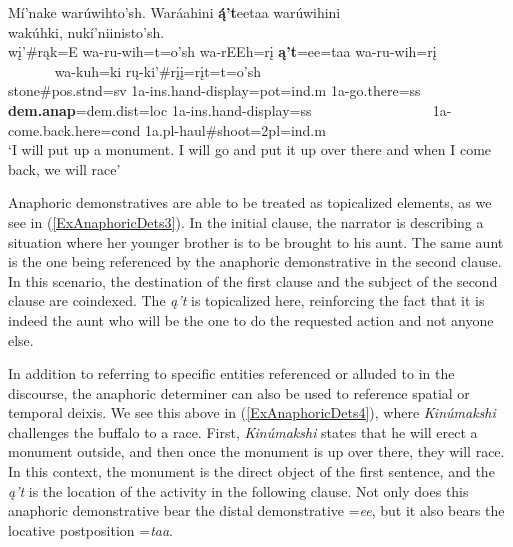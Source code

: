 \begin{exe}
\begin{xlist}
\item\label{ExAnaphoricDets4} \glll Mí'nake warúwihto'sh. Waráahini \textbf{ą́'t}eetaa warúwihini ~ ~ ~ ~ ~ ~ ~ ~ ~ ~ wakúhki, nukí'niinisto'sh.\\
    wį'\#rąk=E wa-ru-wih=t=o'sh wa-rEEh=rį \textbf{ą't}=ee=taa wa-ru-wih=rį ~ ~ ~ ~ ~ ~ ~ ~ ~ ~ wa-kuh=ki rų-ki'\#rįį=rįt=t=o'sh\\
    \textnormal{stone}\#pos.stnd=sv 1a-ins.hand-\textnormal{display}=pot=ind.m 1a-\textnormal{go.there}=ss \textbf{dem.anap}=dem.dist=loc 1a-ins.hand-\textnormal{display}=ss ~ ~ ~ ~ ~ ~ ~ ~ ~ ~ 1a-\textnormal{come.back.here}=cond 1a.pl-\textnormal{haul}\#\textnormal{shoot}=2pl=ind.m\\
\glt `I will put up a monument. I will go and put it up over there and when I come back, we will race' \citep[39]{hollow1973a}

\end{xlist}

\end{exe}


Anaphoric demonstratives are able to be treated as topicalized elements, as we see in (\ref{ExAnaphoricDets3}). In the initial clause, the narrator is describing a situation where her younger brother is to be brought to his aunt. The same aunt is the one being referenced by the anaphoric demonstrative in the second clause. In this scenario, the destination of the first clause and the subject of the second clause are coindexed. The \textit{ą't} is topicalized here, reinforcing the fact that it is indeed the aunt who will be the one to do the requested action and not anyone else.

In addition to referring to specific entities referenced or alluded to in the discourse, the anaphoric determiner can also be used to reference spatial or temporal deixis. We see this above in (\ref{ExAnaphoricDets4}), where \textit{Kinúmakshi} challenges the buffalo to a race. First, \textit{Kinúmakshi} states that he will erect a monument outside, and then once the monument is up over there, they will race. In this context, the monument is the direct object of the first sentence, and the \textit{ą't} is the location of the activity in the following clause. Not only does this anaphoric demonstrative bear the distal demonstrative =\textit{ee}, but it also bears the locative postposition =\textit{taa}.

